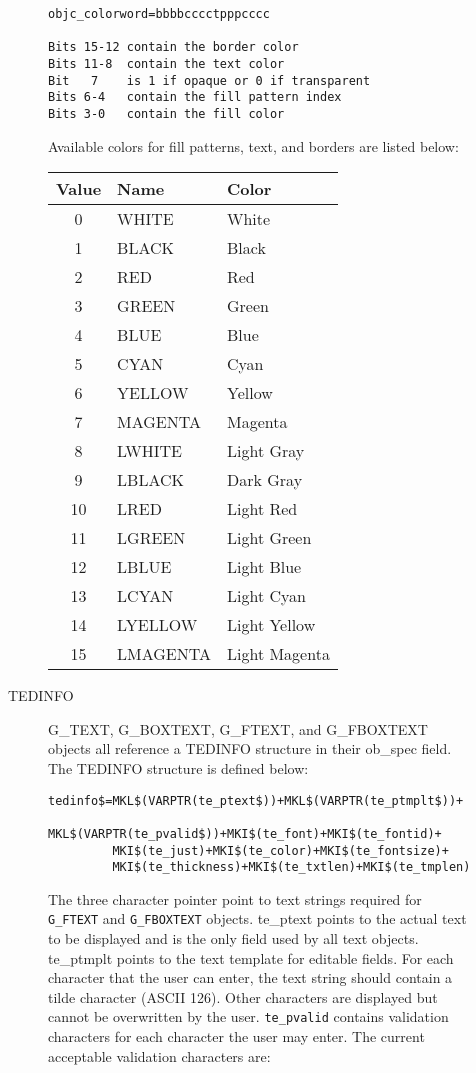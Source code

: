\begin{description}
\begin{description}
\begin{verbatim}
objc_colorword=bbbbcccctpppcccc

Bits 15-12 contain the border color 
Bits 11-8  contain the text color 
Bit   7    is 1 if opaque or 0 if transparent 
Bits 6-4   contain the fill pattern index 
Bits 3-0   contain the fill color 
\end{verbatim}

Available colors for fill patterns, text, and borders are listed
below:
\begin{center}
\begin{tabular}{|cll|}
\hline
{\bf Value} &{\bf  Name}&{\bf  Color}  \\
\hline
 0&  WHITE	&  White\\
 1&  BLACK	&  Black\\
 2&  RED	&  Red\\
 3&  GREEN	&  Green\\
 4&  BLUE	&  Blue\\
 5&  CYAN	&  Cyan\\
 6&  YELLOW	&  Yellow\\
 7&  MAGENTA	&  Magenta\\
 8&  LWHITE	&  Light Gray\\
 9&  LBLACK	&  Dark Gray\\
 10& LRED	&  Light Red\\
 11& LGREEN	&  Light Green\\
 12& LBLUE	&  Light Blue\\
 13& LCYAN	&  Light Cyan\\
 14& LYELLOW	&  Light Yellow\\
 15& LMAGENTA	&  Light Magenta\\
\hline
\end{tabular}
\end{center}


\item[TEDINFO]
G\_TEXT, G\_BOXTEXT, G\_FTEXT, and G\_FBOXTEXT objects all reference a
TEDINFO structure in their ob\_spec field. The TEDINFO structure is
defined below:
 {\footnotesize
\begin{verbatim}                                                         
tedinfo$=MKL$(VARPTR(te_ptext$))+MKL$(VARPTR(te_ptmplt$))+
         MKL$(VARPTR(te_pvalid$))+MKI$(te_font)+MKI$(te_fontid)+
         MKI$(te_just)+MKI$(te_color)+MKI$(te_fontsize)+
         MKI$(te_thickness)+MKI$(te_txtlen)+MKI$(te_tmplen)
\end{verbatim}}

The three character pointer point to text strings required for 
\verb|G_FTEXT|
and \verb|G_FBOXTEXT| objects. te\_ptext points to the actual text to be
displayed and is the only field used by all text objects. te\_ptmplt
points to the text template for editable fields. For each character
that the user can enter, the text string should contain a tilde
character (ASCII 126). Other characters are displayed but cannot be
overwritten by the user. \verb|te_pvalid| contains validation characters for
each character the user may enter. The current acceptable validation
characters are:


\end{description}
\end{description}
